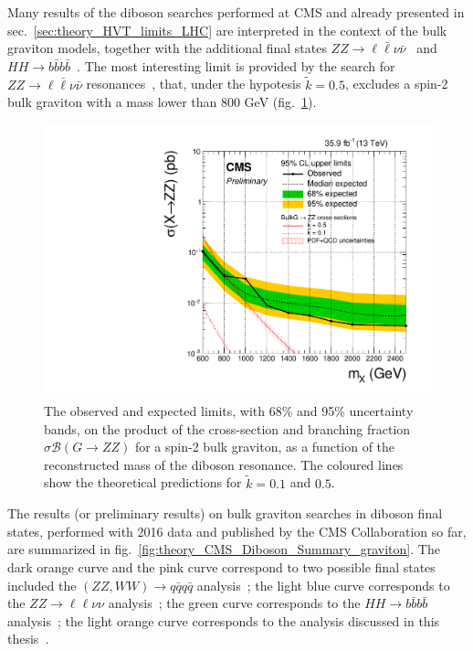 \vspace*{1\baselineskip}

\noindent Many results of the diboson searches performed at CMS and already presented in sec.~\ref{sec:theory_HVT_limits_LHC} are interpreted in the context of the bulk graviton models, together with the additional final states $ZZ \rightarrow \ell \bar{\ell} \nu \bar{\nu}$~\cite{CMS-PAS-B2G-16-023} and $HH \rightarrow b\bar{b} b \bar{b}$~\cite{CMS-PAS-B2G-16-026}. The most interesting limit is provided by the search for $ZZ \rightarrow \ell \bar{\ell} \nu \bar{\nu}$ resonances~\cite{CMS-PAS-B2G-16-023}, that, under the hypotesis $\tilde{k} = 0.5$, excludes a spin-2 bulk graviton with a mass lower than 800 GeV (fig.~\ref{fig:theory_B2G-16-023}).

\begin{figure}[!htb]
  \centering
    \includegraphics[width=.495\textwidth]{figures/B2G-16-023/Figure_005.pdf}
  \caption{The observed and expected limits, with 68\% and 95\% uncertainty bands, on the product of the cross-section and branching fraction $\sigma \mathcal{B} (G \rightarrow ZZ)$ for a spin-2 bulk graviton, as a function of the reconstructed mass of the diboson resonance. The coloured lines show the theoretical predictions for $\tilde{k}=0.1$ and $0.5$.~\cite{CMS-PAS-B2G-16-023}}
  \label{fig:theory_B2G-16-023}
\end{figure}

\vspace*{1\baselineskip}

%
\noindent The results (or preliminary results) on bulk graviton searches in diboson final states, performed with 2016 data and published by the CMS Collaboration so far, are summarized in fig.~\ref{fig:theory_CMS_Diboson_Summary_graviton}. The dark orange curve and the pink curve correspond to two possible final states included the $(ZZ, WW) \rightarrow q\bar{q}q\bar{q}$ analysis~\cite{Sirunyan:2017acf,bib:CMS-PAS-B2G-17-001}; the light blue curve corresponds to the $ZZ \rightarrow \ell \ell \nu \nu$ analysis~\cite{CMS-PAS-B2G-16-023}; the green curve corresponds to the $HH \rightarrow b\bar{b} b \bar{b}$ analysis~\cite{CMS-PAS-B2G-16-026}; the light orange curve corresponds to the analysis discussed in this thesis~\cite{CMS-PAS-B2G-17-005}.

